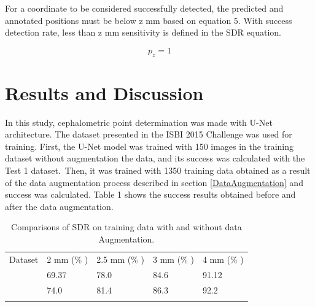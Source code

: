 \documentclass{elektr}
\begin{document}
\tab For a coordinate to be considered successfully detected, the predicted and annotated positions must be below z mm based on equation 5. With success detection rate, less than z mm sensitivity is defined in the SDR equation.

\begin{equation}
	\label{eq5}
	p_{z}=1
\end{equation}


\section{Results and Discussion}
\tab In this study, cephalometric point determination was made with U-Net architecture.  The dataset presented in the ISBI 2015 Challenge was used for training. First, the U-Net model was trained with 150 images in the training dataset without augmentation the data, and its success was calculated with the Test 1 dataset.\  Then, it was trained with 1350 training data obtained as a result of the data augmentation process described in section \ref{DataAugmentation} and success was calculated. Table 1 shows the success results obtained before and after the data augmentation.






\begin{table}[h!]
	\caption{Comparisons of SDR on training data with and without data Augmentation.}
	\begin{center}
		\begin{tabular}{p{1.96in}p{0.69in}p{0.78in}p{0.69in}p{0.68in}}
			\hline
			\multicolumn{1}{|p{1.96in}}{Dataset} & 
			\multicolumn{1}{|p{0.69in}}{2 mm ($\%$ )} & 
			\multicolumn{1}{|p{0.78in}}{2.5 mm ($\%$ )} & 
			\multicolumn{1}{|p{0.69in}}{3 mm ($\%$ )} & 
			\multicolumn{1}{|p{0.68in}|}{4 mm ($\%$ )} \\
			\hhline{-----}
			\multicolumn{1}{|p{1.96in}}{Training dataset without augmentation (150 Images)} & 
			\multicolumn{1}{|p{0.69in}}{69.37} & 
			\multicolumn{1}{|p{0.78in}}{78.0} & 
			\multicolumn{1}{|p{0.69in}}{84.6} & 
			\multicolumn{1}{|p{0.68in}|}{91.12} \\
			\hhline{-----}
			\multicolumn{1}{|p{1.96in}}{Training dataset with augmentation (1350 Images)} & 
			\multicolumn{1}{|p{0.69in}}{74.0} & 
			\multicolumn{1}{|p{0.78in}}{81.4} & 
			\multicolumn{1}{|p{0.69in}}{86.3} & 
			\multicolumn{1}{|p{0.68in}|}{92.2} \\
			\hhline{-----}
		\end{tabular}
		\label{tab1}
	\end{center}\vs{-4mm}
\end{table}
\end{document}
